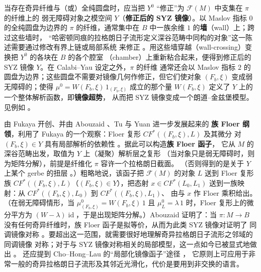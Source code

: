 \documentclass[UTF8,a4paper,11pt,fontset=windows]{ctexart}
\theoremstyle{cnthm}
\numberwithin{equation}{section}
\newcommand{\CF}{CF}                  %
\newcommand{\FF}{\mathcal{F}}         %
\begin{document}
当存在奇异纤维与（或）全纯圆盘时，应当把 $Y^{0}$ “修正”为 $\FF(M)$ 中支集在 $\pi$ 的纤维上的
弱无障碍对象之模空间 $Y$（\textbf{修正后的 SYZ 镜像}）。以 Maslov 指标 $0$ 的全纯圆盘为边界的
$\pi$ 的纤维，通常集中在 $B$ 中一族余维 $1$ 的\textbf{墙}（wall）上；跨过这些墙时，
“哈密顿同痕的拉格朗日子流形定义深谷范畴中同构的对象”这一陈述需要通过修改有界上链或局部系统
来修正 \cite{r44}。用这些墙穿越（wall-crossing）变换把 $Y^{0}$ 的各块在 $B$ 的各个腔室
（chamber）上重新粘合起来，便得到修正后的 SYZ 镜像 $Y$。在 Calabi--Yau 设定之外，$\pi$ 的纤维
通常还会以 Maslov 指标 $2$ 的圆盘为边界；这些圆盘不需要对镜像几何作修正，但它们使对象
$(F_b,\xi)$ 变成弱无障碍的；使得 $\mu^{0}=W(F_b,\xi)\,1_{(F_b,\xi)}$ 成立的那个量
$W(F_b,\xi)$ 定义了 $Y$ 上的一个整体解析函数，即\textbf{镜像超势}，
从而把 SYZ 镜像变成一个朗道--金兹堡模型。见例如 \cite{r19,r7,r100,r105}。


由 Fukaya 开创、并由 Abouzaid \cite{r4,r5}、Tu \cite{r100} 与 Yuan \cite{r105} 进一步发展起来的
\textbf{族 Floer 纲领}，利用了 Fukaya 的一个观察：Floer 复形 $\CF^{*}((F_b,\xi),L)$ 及其微分
对 $(F_b,\xi)\in Y$ 具有局部解析的依赖性 \cite{r41,r42}。据此可以构造\textbf{族 Floer 函子}，
它从 $M$ 的深谷范畴出发，取值为 $Y$ 上（凝聚）解析层之复形
（当对象只是弱无障碍时，则为矩阵分解），前提是纤维化 $\pi$ 容许一个拉格朗日截面。
（否则得到的是关于 $Y$ 上某个 gerbe 的扭层 \cite{r4}。）粗略地说，该函子把 $\FF(M)$ 的对象
$L$ 送到 Floer 复形族 $\CF^{*}((F_b,\xi),L)$（$(F_b,\xi)\in Y$），把态射
$x\in\CF^{*}(L_0,L_1)$ 送到一族映射：从 $\CF^{*}((F_b,\xi),L_0)$ 到 $\CF^{*}((F_b,\xi),L_1)$、
由与 $x$ 作 Floer 乘积给出。（在弱无障碍情形，当
$\mu^{0}_{(F_b,\xi)}=W(F_b,\xi)\,1$ 且 $\mu^{0}_{L}=\lambda\,1$ 时，Floer 复形上的微分平方为
$(W-\lambda)\operatorname{id}$，于是出现矩阵分解。）Abouzaid 证明了：当
$\pi:M\to B$ 没有任何奇异纤维时，族 Floer 函子是拟等价，从而为此类 SYZ 镜像对证明了
同调镜像对称 \cite{r5}。要超出这一范围，就需要很好地理解奇异拉格朗日子流形之邻域的同调镜像
对称；对于与 SYZ 镜像对称相关的局部模型，这一点如今已被显式地做出 \cite{r14,r48}。
还应提到 Cho--Hong--Lau 的“局部化镜像函子”途径 \cite{r33,r34}，
它原则上可应用于非常一般的奇异拉格朗日子流形及其邻近光滑化，代价是要用到非交换的语言。
\end{document}
